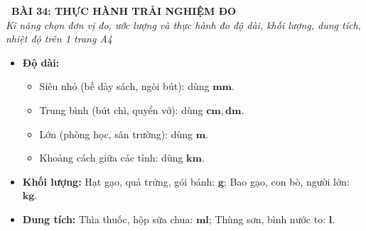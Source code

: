 \documentclass[11pt,a4paper]{article}
\begin{document}
\begin{tcolorbox}[
  enhanced,
  colback=white,
  colframe=primary,
  arc=3mm,
  boxrule=1.2pt,
  left=4mm, right=4mm, top=2.5mm, bottom=2.5mm,
  drop shadow=black!10!white
]
  \centering
  {\Large\bfseries\color{primary}\faBookmark\ BÀI 34: THỰC HÀNH TRẢI NGHIỆM ĐO}\\[1.5mm]
  {\small\itshape\color{black!75}Kĩ năng chọn đơn vị đo, ước lượng và thực hành đo độ dài, khối lượng, dung tích, nhiệt độ trên 1 trang A4}
\end{tcolorbox}

\vspace{-2mm}


\noindent
\begin{minipage}[t]{0.49\textwidth}\vspace{0pt}
\begin{tcolorbox}[
  enhanced,
  colback=blue!4!white,
  colframe=blue!75!black,
  arc=2mm, boxrule=0.8pt,
  left=2mm, right=2mm, top=1.8mm, bottom=1.8mm,
  title={\footnotesize\bfseries\color{white}\faKey\ 1. Nguyên tắc chọn đơn vị đo hợp lý}
]
{\footnotesize
\begin{itemize}\setlength{\itemsep}{1.5pt}\setlength{\leftskip}{-2.5mm}
  \item \textbf{Độ dài:}
  \begin{itemize}\setlength{\itemsep}{0.5pt}\setlength{\leftskip}{-2.5mm}
    \item Siêu nhỏ (bề dày sách, ngòi bút): dùng $\mathbf{mm}$.
    \item Trung bình (bút chì, quyển vở): dùng $\mathbf{cm, dm}$.
    \item Lớn (phòng học, sân trường): dùng $\mathbf{m}$.
    \item Khoảng cách giữa các tỉnh: dùng $\mathbf{km}$.
  \end{itemize}
  \item \textbf{Khối lượng:} Hạt gạo, quả trứng, gói bánh: $\mathbf{g}$; Bao gạo, con bò, người lớn: $\mathbf{kg}$.
  \item \textbf{Dung tích:} Thìa thuốc, hộp sữa chua: $\mathbf{ml}$; Thùng sơn, bình nước to: $\mathbf{l}$.
\end{itemize}
}
\end{tcolorbox}
\end{minipage}
\hfill
\end{document}
